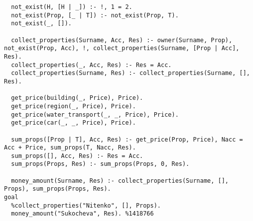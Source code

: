 \begin{lstlisting}
  not_exist(H, [H | _]) :- !, 1 = 2.
  not_exist(Prop, [_ | T]) :- not_exist(Prop, T).
  not_exist(_, []).

  collect_properties(Surname, Acc, Res) :- owner(Surname, Prop), not_exist(Prop, Acc), !, collect_properties(Surname, [Prop | Acc], Res).
  collect_properties(_, Acc, Res) :- Res = Acc.
  collect_properties(Surname, Res) :- collect_properties(Surname, [], Res).
  
  get_price(building(_, Price), Price).
  get_price(region(_, Price), Price).
  get_price(water_transport(_, _, Price), Price).
  get_price(car(_, _, Price), Price).

  sum_props([Prop | T], Acc, Res) :- get_price(Prop, Price), Nacc = Acc + Price, sum_props(T, Nacc, Res).
  sum_props([], Acc, Res) :- Res = Acc.
  sum_props(Props, Res) :- sum_props(Props, 0, Res).

  money_amount(Surname, Res) :- collect_properties(Surname, [], Props), sum_props(Props, Res).
goal
  %collect_properties("Nitenko", [], Props).
  money_amount("Sukocheva", Res). %1418766
\end{lstlisting}
